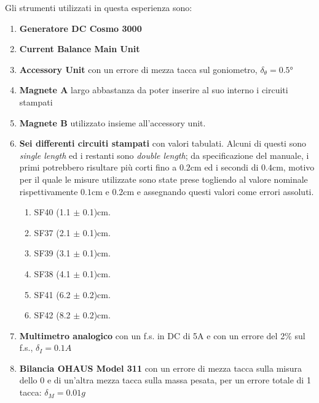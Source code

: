 {\fontsize{11}{14}\selectfont 
Gli strumenti utilizzati in questa esperienza sono:
\begin{enumerate}
    \item \textbf{Generatore DC Cosmo 3000}
    \item \textbf{Current Balance Main Unit}
    \item \textbf{Accessory Unit} con un errore di mezza tacca sul goniometro, $\delta_{\theta} = 0.5$°
    \item \textbf{Magnete A} largo abbastanza da poter inserire al suo interno i circuiti stampati 
    \item \textbf{Magnete B} utilizzato insieme all'accessory unit.
    \item \textbf{Sei differenti circuiti stampati} con valori tabulati. Alcuni di questi sono \emph{single length} ed i restanti sono \emph{double length}; da specificazione del manuale, i primi potrebbero risultare più corti fino a $0.2$cm ed i secondi di $0.4$cm, motivo per il quale le misure utilizzate sono state prese togliendo al valore nominale rispettivamente $0.1$cm e $0.2$cm e assegnando questi valori come errori assoluti.
    \begin{enumerate}
        \item {SF40 (1.1 $\pm$ 0.1)cm}.
        \item {SF37 (2.1 $\pm$ 0.1)cm}.
        \item {SF39 (3.1 $\pm$ 0.1)cm}.
        \item {SF38 (4.1 $\pm$ 0.1)cm}.
        \item {SF41 (6.2 $\pm$ 0.2)cm}.
        \item {SF42 (8.2 $\pm$ 0.2)cm}.
    \end{enumerate}
    \item \textbf{Multimetro analogico} con un f.s. in DC di 5A e con un errore del 2\% sul f.s., $\delta_{I} = 0.1A$
    \item \textbf{Bilancia OHAUS Model 311} con un errore di mezza tacca sulla misura dello 0 e di un'altra mezza tacca sulla massa pesata, per un errore totale di 1 tacca: $\delta_{M} = 0.01g$
\end{enumerate}

\par}